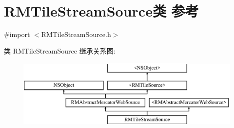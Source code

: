 \hypertarget{interface_r_m_tile_stream_source}{\section{R\-M\-Tile\-Stream\-Source类 参考}
\label{interface_r_m_tile_stream_source}
}


{\ttfamily \#import $<$R\-M\-Tile\-Stream\-Source.\-h$>$}

类 R\-M\-Tile\-Stream\-Source 继承关系图\-:\begin{figure}[H]
\begin{center}
\leavevmode
\includegraphics[height=3.425076cm]{interface_r_m_tile_stream_source}
\end{center}
\end{figure}
